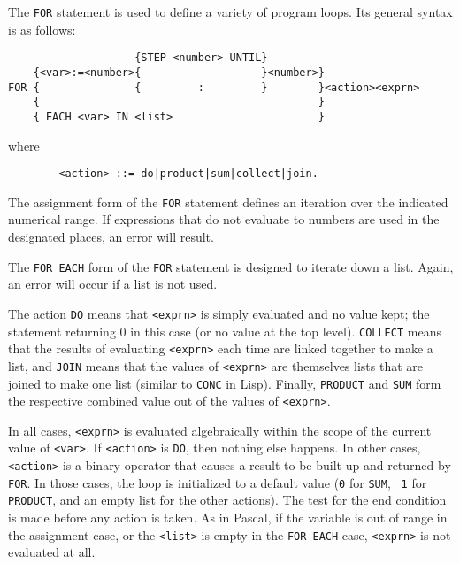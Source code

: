 The {\tt FOR} statement is used to define a variety of program
loops.  Its general syntax is as follows:
    
\begin{verbatim}
                    {STEP <number> UNTIL}
    {<var>:=<number>{                   }<number>}
FOR {               {         :         }        }<action><exprn>
    {                                            }
    { EACH <var> IN <list>                       }
\end{verbatim}
where
\begin{verbatim}
        <action> ::= do|product|sum|collect|join.
\end{verbatim}
The assignment form of the {\tt FOR} statement defines an
iteration over the indicated numerical range.  If expressions that do not
evaluate to numbers are used in the designated places, an error will
result.

The {\tt FOR EACH}  form of the {\tt FOR} statement is
designed to iterate down a list.  Again, an error will occur if a list is
not used.

The action {\tt DO}  means that {\tt <exprn>} is simply
evaluated and no value kept; the statement returning 0 in this case (or no
value at the top level). {\tt COLLECT} means that the results of
evaluating {\tt <exprn>} each time are linked together to make a list,
and {\tt JOIN} means that the values of {\tt <exprn>} are themselves
lists that are joined to make one list (similar to {\tt CONC} in Lisp).
Finally, {\tt PRODUCT}  and {\tt SUM} 
form the respective combined value out of the values of {\tt <exprn>}.

In all cases, {\tt <exprn>} is evaluated algebraically within the
scope of the current value of {\tt <var>}.  If {\tt <action>} is
{\tt DO}, then nothing else happens.  In other cases, {\tt
<action>} is a binary operator that causes a result to be built up and
returned by {\tt FOR}.  In those cases, the loop is
initialized to a default value ({\tt 0} for {\tt SUM},  {\tt
1} for {\tt PRODUCT},  and an empty list for the other
actions).  The test for the end condition is made before any action is
taken.  As in Pascal, if the variable is out of range in the assignment
case, or the {\tt <list>} is empty in the {\tt FOR EACH}
case, {\tt <exprn>} is not evaluated at all.

